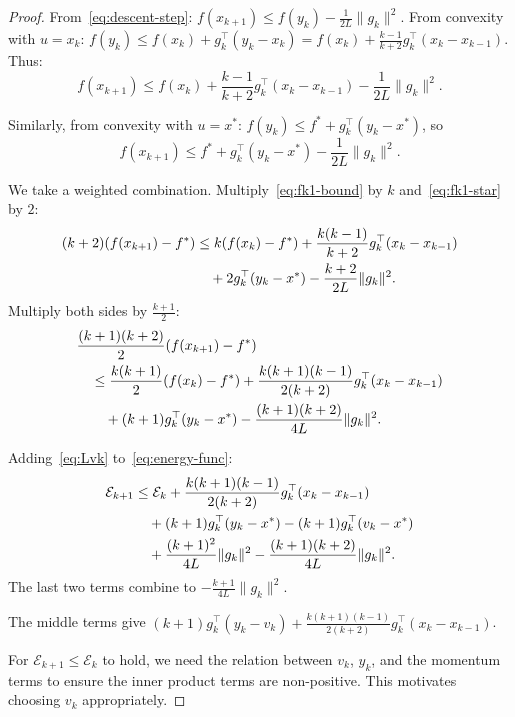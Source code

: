 \documentclass[11pt,a4paper]{article}
\begin{document}
\begin{proof}
From~\eqref{eq:descent-step}: $f(x_{k+1}) \le f(y_k) - \frac{1}{2L}\|g_k\|^2$.
From convexity with $u = x_k$: $f(y_k) \le f(x_k) + g_k^\top(y_k - x_k)
= f(x_k) + \frac{k-1}{k+2}g_k^\top(x_k - x_{k-1})$. Thus:
\begin{equation}\label{eq:fk1-bound}
  f(x_{k+1}) \le f(x_k) + \frac{k-1}{k+2}g_k^\top(x_k - x_{k-1})
  - \frac{1}{2L}\|g_k\|^2.
\end{equation}

Similarly, from convexity with $u = x^*$:
$f(y_k) \le f^* + g_k^\top(y_k - x^*)$, so
\begin{equation}\label{eq:fk1-star}
  f(x_{k+1}) \le f^* + g_k^\top(y_k - x^*) - \frac{1}{2L}\|g_k\|^2.
\end{equation}

We take a weighted combination. Multiply~\eqref{eq:fk1-bound} by $k$
and~\eqref{eq:fk1-star} by $2$:
\begin{align}
  (k+2)(f(x_{k+1}) - f^*)
  &\le k(f(x_k) - f^*) + \frac{k(k-1)}{k+2}g_k^\top(x_k - x_{k-1})
  \notag \\
  &\quad + 2g_k^\top(y_k - x^*)
  - \frac{k+2}{2L}\|g_k\|^2. \label{eq:weighted-fk1}
\end{align}
Multiply both sides by $\frac{k+1}{2}$:
\begin{align}
  &\frac{(k+1)(k+2)}{2}(f(x_{k+1}) - f^*) \notag \\
  &\quad \le \frac{k(k+1)}{2}(f(x_k) - f^*)
  + \frac{k(k+1)(k-1)}{2(k+2)}g_k^\top(x_k - x_{k-1}) \notag \\
  &\quad\quad + (k+1)g_k^\top(y_k - x^*)
  - \frac{(k+1)(k+2)}{4L}\|g_k\|^2. \label{eq:energy-func}
\end{align}

Adding~\eqref{eq:Lvk} to~\eqref{eq:energy-func}:
\begin{align}
  \mathcal{E}_{k+1}
  &\le \mathcal{E}_k
  + \frac{k(k+1)(k-1)}{2(k+2)}g_k^\top(x_k - x_{k-1}) \notag \\
  &\quad + (k+1)g_k^\top(y_k - x^*)
  - (k+1)g_k^\top(v_k - x^*) \notag \\
  &\quad + \frac{(k+1)^2}{4L}\|g_k\|^2
  - \frac{(k+1)(k+2)}{4L}\|g_k\|^2. \label{eq:Ek1-bound}
\end{align}
The last two terms combine to
$-\frac{k+1}{4L}\|g_k\|^2$.

The middle terms give
$(k+1)g_k^\top(y_k - v_k)
+ \frac{k(k+1)(k-1)}{2(k+2)}g_k^\top(x_k - x_{k-1})$.

For $\mathcal{E}_{k+1} \le \mathcal{E}_k$ to hold, we need the relation
between $v_k$, $y_k$, and the momentum terms to ensure the inner product
terms are non-positive. This motivates choosing $v_k$ appropriately.
\end{proof}
\end{document}
